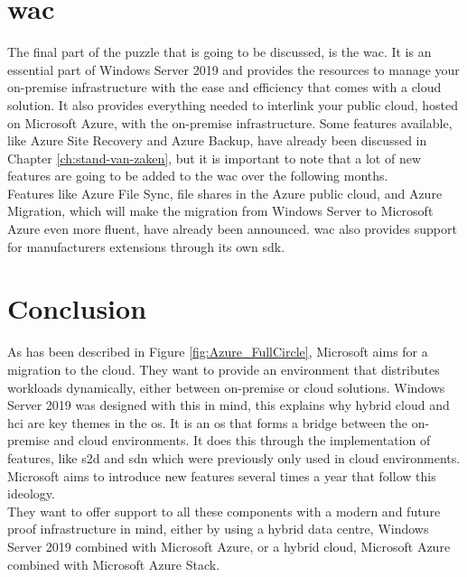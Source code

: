\section{\acrfull{wac}}
The final part of the puzzle that is going to be discussed, is the \acrlong{wac}. 
It is an essential part of Windows Server 2019 and provides the resources to manage your on-premise infrastructure with the ease and efficiency that comes with a cloud solution. 
It also provides everything needed to interlink your public cloud, hosted on Microsoft Azure, with the on-premise infrastructure. 
Some features available, like Azure Site Recovery and Azure Backup, have already been discussed in Chapter \ref{ch:stand-van-zaken}, but it is important to note that a lot of new features are going to be added to the \acrlong{wac} over the following months. \autocite{Singh2019} 
\\
Features like Azure File Sync, file shares in the Azure public cloud, and Azure Migration, which will make the migration from Windows Server to Microsoft Azure even more fluent, have already been announced. 
\acrlong{wac} also provides support for manufacturers extensions through its own \acrfull{sdk}. 	

\section{Conclusion}
As has been described in Figure \ref{fig:Azure_FullCircle}, Microsoft aims for a migration to the cloud. 
They want to provide an environment that distributes workloads dynamically, either between on-premise or cloud solutions. 
Windows Server 2019 was designed with this in mind, this explains why hybrid cloud and \acrshort{hci} are key themes in the \acrshort{os}. 
It is an \acrshort{os} that forms a bridge between the on-premise and cloud environments. 
It does this through the implementation of features, like \acrfull{s2d} and \acrfull{sdn} which were previously only used in cloud environments. 
Microsoft aims to introduce new features several times a year that follow this ideology.
\\
They want to offer support to all these components with a modern and future proof infrastructure in mind, either by using a hybrid data centre, Windows Server 2019 combined with Microsoft Azure, or a hybrid cloud, Microsoft Azure combined with Microsoft Azure Stack.